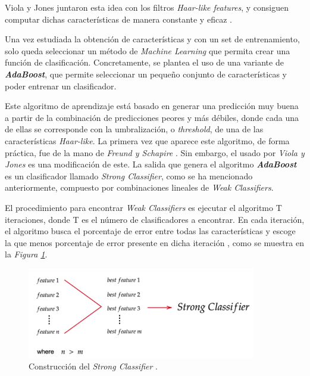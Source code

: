 Viola y Jones juntaron esta idea con los filtros \textit{Haar-like features}, y consiguen computar dichas características de manera constante y eficaz \cite{integral}.


%
Una vez estudiada la obtención de características y con un set de entrenamiento, solo queda seleccionar un método de \textit{Machine Learning} que permita crear una función de clasificación. Concretamente, se plantea el uso de una variante de \textbf{\textit{AdaBoost}}, que permite seleccionar un pequeño conjunto de características y poder entrenar un clasificador. 

Este algoritmo de aprendizaje está basado en generar una predicción muy buena a partir de la combinación de predicciones peores y más débiles, donde cada una de ellas se corresponde con la umbralización, o \textit{threshold}, de una de las características \textit{Haar-like}. La primera vez que aparece este algoritmo, de forma práctica, fue de la mano de \textit{Freund y Schapire} \cite{adaboost1}. Sin embargo, el usado por \textit{Viola y Jones} es una modificación de este. La salida que genera el algoritmo \textbf{\textit{AdaBoost}} es un clasificador llamado \textit{Strong Classifier}, como se ha mencionado anteriormente, compuesto por combinaciones lineales de \textit{Weak Classifiers}. 

El procedimiento para encontrar \textit{Weak Classifiers} es ejecutar el algoritmo T iteraciones, donde T es el número de clasificadores a encontrar. En cada iteración, el algoritmo busca el porcentaje de error entre todas las características y escoge la que menos porcentaje de error presente en dicha iteración \cite{adaboost2}, como se muestra en la \textit{Figura \ref{fig:ada1}}. 

\begin{figure}[htp]
	\centering
	\includegraphics[width=10cm]{imagenes/ada1.png}
	\caption[Construcción del \textit{Strong Classifier}]{Construcción del \textit{Strong Classifier} \cite{adaboost2}.}
	\label{fig:ada1}
\end{figure}

